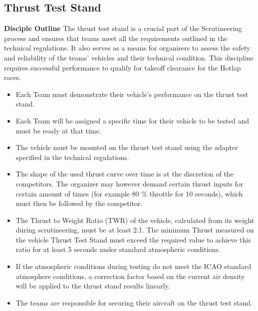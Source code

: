     \subsection{Thrust Test Stand}
    \textbf{Disciple Outline}
    The thrust test stand is a crucial part of the Scrutineering process and ensures that teams meet all the requirements outlined in the technical regulations. It also serves as a means for organisers to assess the safety and reliability of the teams' vehicles and their technical condition. This discipline requires successful performance to qualify for takeoff clearance for the Hotlap races.
    \begin{itemize}
      \item Each Team must demonstrate their vehicle's performance on the thrust test stand.
      \item Each Team will be assigned a specific time for their vehicle to be tested and must be ready at that time.
      \item The vehicle must be mounted on the thrust test stand using the adapter specified in the technical regulations.
      \item The shape of the used thrust curve over time is at the discretion of the competitors. The organizer may however demand certain thrust inputs for certain amount of times (for example 80 \% throttle for 10 seconds), which must then be followed by the competitor.
      \item The Thrust to Weight Ratio (TWR) of the vehicle, calculated from its weight during scrutineering, must be at least 2:1. The minimum Thrust measured on the vehicle Thrust Test Stand must exceed the required value to achieve this ratio for at least 5 seconds under standard atmospheric conditions.
      \item If the atmospheric conditions during testing do not meet the ICAO standard atmosphere conditions, a correction factor based on the current air density will be applied to the thrust stand results linearly.
      \item The teams are responsible for securing their aircraft on the thrust test stand.
    \end{itemize}



